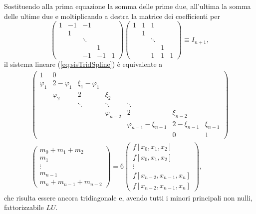 Sostituendo alla prima equazione la somma delle prime due, all'ultima la somma delle ultime due e moltiplicando a destra la matrice dei coefficienti per
\begin{equation*}
    \begin{pmatrix}
        1 & -1 & -1&&\\
        & 1 &&&\\
        &&\ddots&&\\
        &&&1&\\
        &&-1&-1&1
    \end{pmatrix} \begin{pmatrix}
        1 & 1 & 1&&\\
        & 1 &&&\\
        &&\ddots&&\\
        &&&1&\\
        &&1&1&1
    \end{pmatrix}\equiv I_{n+1},
\end{equation*}
il sistema lineare (\ref{eq:sisTridSpline}) è equivalente a
\begin{equation}
    \begin{matrix}
        \begin{pmatrix}
        1 & 0 & &&&& \\
        \varphi_1 & 2-\varphi_1 & \xi_1-\varphi_1&&&&\\
        &\varphi_2 & 2 &\xi_2&&&\\
        &&\ddots & \ddots &\ddots&&\\
        && & \varphi_{n-2} & 2&\xi_{n-2}&\\
        &&&&\varphi_{n-1}-\xi_{n-1} & 2-\xi_{n-1} &\xi_{n-1}\\
        &&&&& 0 & 1
    \end{pmatrix}\\
    \begin{pmatrix}
        m_0+m_1+m_2\\
        m_1\\
        \vdots\\
        m_{n-1}\\
        m_n+m_{n-1}+m_{n-2}
    \end{pmatrix}=6\begin{pmatrix}
        f[x_0,x_1,x_2]\\
        f[x_0,x_1,x_2]\\
        \vdots\\
        f[x_{n-2},x_{n-1},x_n]\\
        f[x_{n-2},x_{n-1},x_n]
    \end{pmatrix},
    \end{matrix}
\end{equation}
che risulta essere ancora tridiagonale e, avendo tutti i minori principali non nulli, fattorizzabile $LU$.

